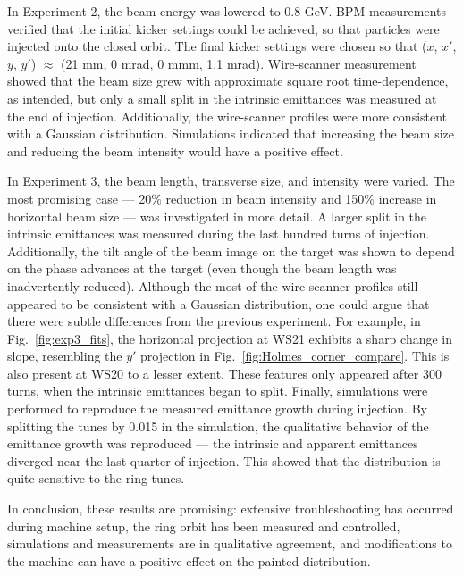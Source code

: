 In Experiment 2, the beam energy was lowered to 0.8 GeV. BPM measurements verified that the initial kicker settings could be achieved, so that particles were injected onto the closed orbit. The final kicker settings were chosen so that ($x$, $x'$, $y$, $y'$) $\approx$ (21 mm, 0 mrad, 0 mmm, 1.1 mrad). Wire-scanner measurement showed that the beam size grew with approximate square root time-dependence, as intended, but only a small split in the intrinsic emittances was measured at the end of injection. Additionally, the wire-scanner profiles were more consistent with a Gaussian distribution. Simulations indicated that increasing the beam size and reducing the beam intensity would have a positive effect. 

In Experiment 3, the beam length, transverse size, and intensity were varied. The most promising case — 20\% reduction in beam intensity and 150\% increase in horizontal beam size — was investigated in more detail. A larger split in the intrinsic emittances was measured during the last hundred turns of injection. Additionally, the tilt angle of the beam image on the target was shown to depend on the phase advances at the target (even though the beam length was inadvertently reduced). Although the most of the wire-scanner profiles still appeared to be consistent with a Gaussian distribution, one could argue that there were subtle differences from the previous experiment. For example, in Fig.~\ref{fig:exp3_fits}, the horizontal projection at WS21 exhibits a sharp change in slope, resembling the $y'$ projection in Fig.~\ref{fig:Holmes_corner_compare}. This is also present at WS20 to a lesser extent. These features only appeared after 300 turns, when the intrinsic emittances began to split. Finally, simulations were performed to reproduce the measured emittance growth during injection. By splitting the tunes by 0.015 in the simulation, the qualitative behavior of the emittance growth was reproduced — the intrinsic and apparent emittances diverged near the last quarter of injection. This showed that the distribution is quite sensitive to the ring tunes.

In conclusion, these results are promising: extensive troubleshooting has occurred during machine setup, the ring orbit has been measured and controlled, simulations and measurements are in qualitative agreement, and modifications to the machine can have a positive effect on the painted distribution.